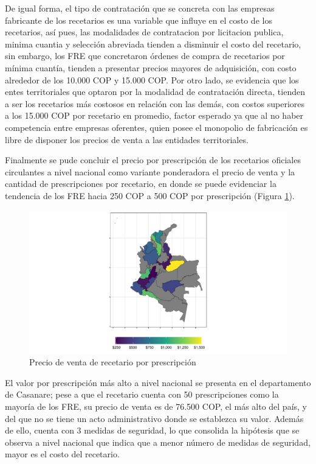 \documentclass[
]{book}
\begin{document}
De igual forma, el tipo de contratación que se concreta con las empresas fabricante de los recetarios es una variable que influye en el costo de los recetarios, así pues, las modalidades de contratacion por licitacion publica, minima cuantia y selección abreviada tienden a disminuir el costo del recetario, sin embargo, los FRE que concretaron órdenes de compra de recetarios por mínima cuantía, tienden a presentar precios mayores de adquisición, con costo alrededor de los 10.000 COP y 15.000 COP. Por otro lado, se evidencia que los entes territoriales que optaron por la modalidad de contratación directa, tienden a ser los recetarios más costosos en relación con las demás, con costos superiores a los 15.000 COP por recetario en promedio, factor esperado ya que al no haber competencia entre empresas oferentes, quien posee el monopolio de fabricación es libre de disponer los precios de venta a las entidades territoriales.

Finalmente se pude concluir el precio por prescripción de los recetarios oficiales circulantes a nivel nacional como variante ponderadora el precio de venta y la cantidad de prescripciones por recetario, en donde se puede evidenciar la tendencia de los FRE hacia 250 COP a 500 COP por prescripción (Figura \ref{fig:PVTA-Recetarios}).

\begin{figure}
\includegraphics[width=0.9\linewidth]{InformeFinal_files/figure-latex/PVTA-Recetarios-1} \caption{Precio de venta de recetario por prescripción}\label{fig:PVTA-Recetarios}
\end{figure}

El valor por prescripción más alto a nivel nacional se presenta en el departamento de Casanare; pese a que el recetario cuenta con 50 prescripciones como la mayoría de los FRE, su precio de venta es de 76.500 COP, el más alto del país, y del que no se tiene un acto administrativo donde se establezca su valor. Además de ello, cuenta con 3 medidas de seguridad, lo que consolida la hipótesis que se observa a nivel nacional que indica que a menor número de medidas de seguridad, mayor es el costo del recetario.
\end{document}

